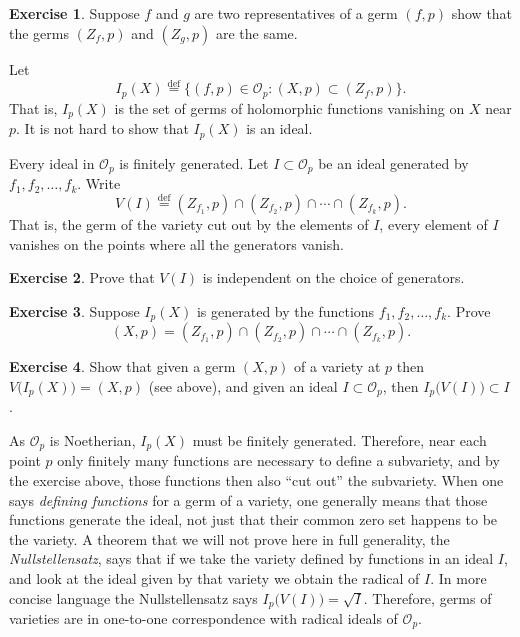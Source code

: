 \documentclass[12pt,openany]{book}
\newcommand{\sO}{{\mathcal{O}}}
\newcommand{\myindex}[1]{#1\index{#1}}
\theoremstyle{plain}
\theoremstyle{remark}
\theoremstyle{definition}
\newenvironment{exbox}{%
    \def\FrameCommand{\vrule width 1pt \relax\hspace {10pt}}%
    \MakeFramed {\advance \hsize -\width \FrameRestore }%
}{%
    \endMakeFramed
}
\theoremstyle{exercise}
\newtheorem{exercise}{Exercise}[section]
\theoremstyle{example}
\begin{document}
\begin{exbox}
\begin{exercise}
Suppose $f$ and $g$ are two representatives of a germ $(f,p)$
show that the germs $(Z_f,p)$ and $(Z_g,p)$ are the same.
\end{exercise}
\end{exbox}

Let
\begin{equation*}
I_p(X) \overset{\text{def}}{=}
\{ (f,p) \in \sO_p : (X,p) \subset (Z_f,p) \} .
\end{equation*}
That is, $I_p(X)$ is the set of germs of holomorphic functions vanishing on
$X$ near $p$.  It is not hard to show that $I_p(X)$ is an ideal.

Every ideal in $\sO_p$ is finitely generated.
Let $I \subset \sO_p$ be an ideal generated by $f_1,f_2,\ldots,f_k$.
Write
\begin{equation*}
V(I) \overset{\text{def}}{=}
(Z_{f_1},p) \cap (Z_{f_2},p) \cap \cdots \cap (Z_{f_k},p) .
\end{equation*}
That is, the germ of the variety cut out by the elements of $I$, every
element of $I$ vanishes on the points where all the generators vanish.

\begin{exbox}
\begin{exercise}
Prove that $V(I)$ is independent on the choice of generators.
\end{exercise}

\begin{exercise}
Suppose $I_p(X)$ is generated by the functions $f_1, f_2, \ldots, f_k$.
Prove 
\begin{equation*}
(X,p) = (Z_{f_1},p) \cap (Z_{f_2},p) \cap \cdots \cap (Z_{f_k},p) .
\end{equation*}
\end{exercise}

\begin{exercise}
Show that given a germ $(X,p)$ of a variety at $p$ then
$V\bigl(I_p(X)\bigr) = (X,p)$ (see above), and
given an ideal $I \subset \sO_p$, then
$I_p\bigl(V(I)\bigr) \subset I$.
\end{exercise}
\end{exbox}

As $\sO_p$ is Noetherian, $I_p(X)$ must be finitely
generated.  Therefore, near each point $p$ only finitely many functions are
necessary to define a subvariety, and by the exercise above, those functions 
then also ``cut out'' the subvariety.  When one says 
\emph{\myindex{defining functions}} for a germ of a variety, one generally
means that those functions generate the ideal, not just that their common
zero set happens to be the variety.  A theorem that we will not prove here
in full generality,
the \emph{\myindex{Nullstellensatz}}, says that if we take the variety defined by functions
in an ideal $I$, and look at the ideal given by that variety we obtain the
radical of $I$.  In more concise language the Nullstellensatz says
$I_p\bigl(V(I)\bigr) = \sqrt{I}$.
Therefore, germs of varieties are in
one-to-one correspondence with radical ideals of $\sO_p$.
\end{document}
